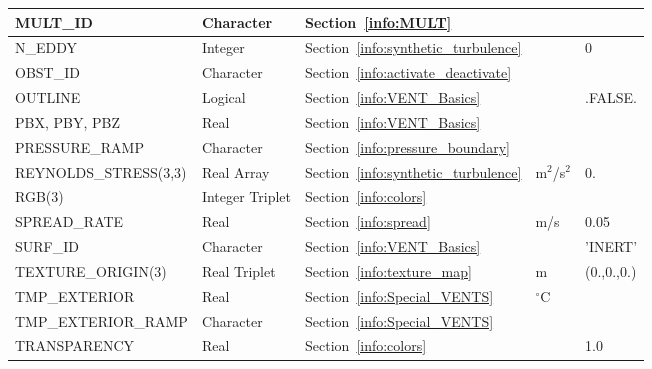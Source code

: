 \documentclass[11pt]{book}
\begin{document}
\begin{longtable}{@{\extracolsep{\fill}}|l|l|l|l|l|}
{\ct MULT\_ID    }          & Character         & Section~\ref{info:MULT}                                   &               &                     \\ \hline
{\ct N\_EDDY}               & Integer           & Section~\ref{info:synthetic_turbulence}                   &               & 0                   \\ \hline
{\ct OBST\_ID }             & Character         & Section~\ref{info:activate_deactivate}                    &               &                     \\ \hline
{\ct OUTLINE}               & Logical           & Section~\ref{info:VENT_Basics}                            &               &  {\ct .FALSE.}      \\ \hline
{\ct PBX, PBY, PBZ  }       & Real              & Section~\ref{info:VENT_Basics}                            &               &                     \\ \hline
{\ct PRESSURE\_RAMP}        & Character         & Section~\ref{info:pressure_boundary}                      &               &                     \\ \hline
{\ct REYNOLDS\_STRESS(3,3)} & Real Array        & Section~\ref{info:synthetic_turbulence}                   & m$^2$/s$^2$   & 0.                  \\ \hline
{\ct RGB(3)   }             & Integer Triplet   & Section~\ref{info:colors}                                 &               &                     \\ \hline
{\ct SPREAD\_RATE}          & Real              & Section~\ref{info:spread}                                 & m/s           &  0.05               \\ \hline
{\ct SURF\_ID}              & Character         & Section~\ref{info:VENT_Basics}                            &               &  {\ct 'INERT'}      \\ \hline
{\ct TEXTURE\_ORIGIN(3)}    & Real Triplet      & Section~\ref{info:texture_map}                            & m             & (0.,0.,0.)          \\ \hline
{\ct TMP\_EXTERIOR}         & Real              & Section~\ref{info:Special_VENTS}                          & $^\circ$C     &                     \\ \hline
{\ct TMP\_EXTERIOR\_RAMP}   & Character         & Section~\ref{info:Special_VENTS}                          &               &                     \\ \hline
{\ct TRANSPARENCY}          & Real              & Section~\ref{info:colors}                                 &               &   1.0               \\ \hline

\end{longtable}
\end{document}
